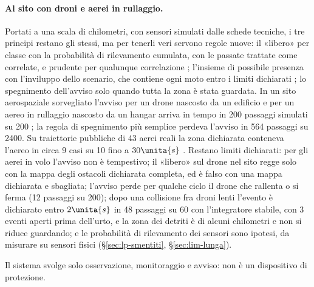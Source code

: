 \paragraph{Al sito con droni e aerei in rullaggio.} Portati a una scala di chilometri, con sensori simulati dalle schede tecniche, i tre principi restano gli stessi, ma per tenerli veri servono regole nuove: il «libero» per classe con la probabilità di rilevamento cumulata, con le passate trattate come correlate, e prudente per qualunque correlazione ; l'insieme di possibile presenza con l'inviluppo dello scenario, che contiene ogni moto entro i limiti dichiarati ; lo spegnimento dell'avviso solo quando tutta la zona è stata guardata. In un sito aerospaziale sorvegliato l'avviso per un drone nascosto da un edificio e per un aereo in rullaggio nascosto da un hangar arriva in tempo in 200 passaggi simulati su 200 ; la regola di spegnimento più semplice perdeva l'avviso in 564 passaggi su 2400. Su traiettorie pubbliche di 43 aerei reali la zona dichiarata conteneva l'aereo in circa 9 casi su 10 fino a $30\unita{s}$ .
Restano limiti dichiarati: per gli aerei in volo l'avviso non è tempestivo; il «libero» sul drone nel sito regge solo con la mappa degli ostacoli dichiarata completa, ed è falso con una mappa dichiarata e sbagliata; l'avviso perde per qualche ciclo il drone che rallenta o si ferma (12 passaggi su 200); dopo una collisione fra droni lenti l'evento è dichiarato entro $2\unita{s}$ in 48 passaggi su 60 con l'integratore stabile, con 3 eventi aperti prima dell'urto, e la zona dei detriti è di alcuni chilometri e non si riduce guardando; e le probabilità di rilevamento dei sensori sono ipotesi, da misurare su sensori fisici (\S\ref{sec:lp-smentiti}, \S\ref{sec:lim-lunga}).

Il sistema svolge solo osservazione, monitoraggio e avviso: non è un dispositivo di protezione.
